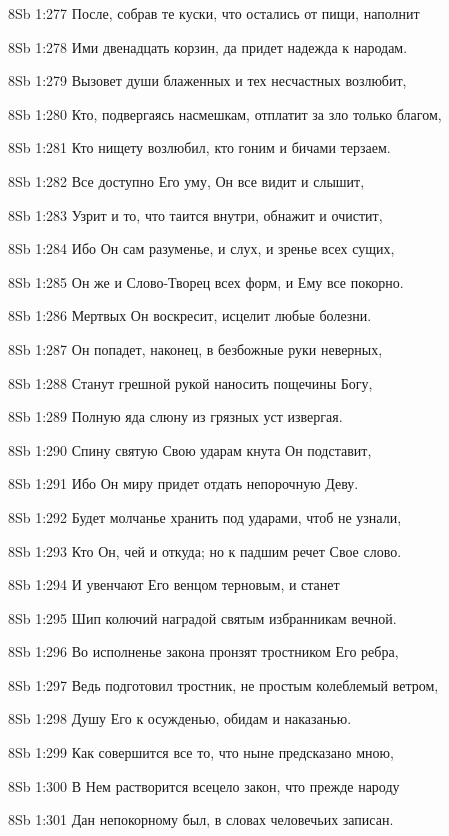 \vs 8Sb 1:277 После, собрав те куски, что остались от пищи, наполнит 

\vs 8Sb 1:278 Ими двенадцать корзин, да придет надежда к народам. 

\vs 8Sb 1:279 Вызовет души блаженных и тех несчастных возлюбит,

\vs 8Sb 1:280 Кто, подвергаясь насмешкам, отплатит за зло только благом, 

\vs 8Sb 1:281 Кто нищету возлюбил, кто гоним и бичами терзаем. 

\vs 8Sb 1:282 Все доступно Его уму, Он все видит и слышит, 

\vs 8Sb 1:283 Узрит и то, что таится внутри, обнажит и очистит, 

\vs 8Sb 1:284 Ибо Он сам разуменье, и слух, и зренье всех сущих,

\vs 8Sb 1:285 Он же и Слово-Творец всех форм, и Ему все покорно. 

\vs 8Sb 1:286 Мертвых Он воскресит, исцелит любые болезни. 

\vs 8Sb 1:287 Он попадет, наконец, в безбожные руки неверных, 

\vs 8Sb 1:288 Станут грешной рукой наносить пощечины Богу, 

\vs 8Sb 1:289 Полную яда слюну из грязных уст извергая.

\vs 8Sb 1:290 Спину святую Свою ударам кнута Он подставит, 

\vs 8Sb 1:291 Ибо Он миру придет отдать непорочную Деву. 

\vs 8Sb 1:292 Будет молчанье хранить под ударами, чтоб не узнали, 

\vs 8Sb 1:293 Кто Он, чей и откуда; но к падшим речет Свое слово. 

\vs 8Sb 1:294 И увенчают Его венцом терновым, и станет

\vs 8Sb 1:295 Шип колючий наградой святым избранникам вечной. 

\vs 8Sb 1:296 Во исполненье закона пронзят тростником Его ребра, 

\vs 8Sb 1:297 Ведь подготовил тростник, не простым колеблемый ветром, 

\vs 8Sb 1:298 Душу Его к осужденью, обидам и наказанью. 

\vs 8Sb 1:299 Как совершится все то, что ныне предсказано мною,

\vs 8Sb 1:300 В Нем растворится всецело закон, что прежде народу 

\vs 8Sb 1:301 Дан непокорному был, в словах человечьих записан. 


